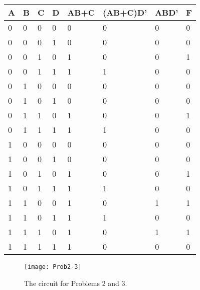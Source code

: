 \begin{enumerate}
\begin{enumerate}
\begin{onlysolution}
                    \begin{tabular}{l|l|l|l|l|l|l|l}
                        A &  B &  C &  D & AB+C  & (AB+C)D' & ABD'  &  F    \\ \hline \rowcolor{gray!15}
                        0 &  0 &  0 &  0 &  0 &  0 &  0 &  0                \\ \hline
                        0 &  0 &  0 &  1 &  0 &  0 &  0 &  0                \\ \hline \rowcolor{gray!15}
                        0 &  0 &  1 &  0 &  1 &  0 &  0 &  1                \\ \hline
                        0 &  0 &  1 &  1 &  1 &  1 &  0 &  0                \\ \hline \rowcolor{gray!15}
                        0 &  1 &  0 &  0 &  0 &  0 &  0 &  0                \\ \hline
                        0 &  1 &  0 &  1 &  0 &  0 &  0 &  0                \\ \hline \rowcolor{gray!15}
                        0 &  1 &  1 &  0 &  1 &  0 &  0 &  1                \\ \hline
                        0 &  1 &  1 &  1 &  1 &  1 &  0 &  0                \\ \hline \rowcolor{gray!15}
                        1 &  0 &  0 &  0 &  0 &  0 &  0 &  0                \\ \hline
                        1 &  0 &  0 &  1 &  0 &  0 &  0 &  0                \\ \hline \rowcolor{gray!15}
                        1 &  0 &  1 &  0 &  1 &  0 &  0 &  1                \\ \hline
                        1 &  0 &  1 &  1 &  1 &  1 &  0 &  0                \\ \hline \rowcolor{gray!15}
                        1 &  1 &  0 &  0 &  1 &  0 &  1 &  1                \\ \hline
                        1 &  1 &  0 &  1 &  1 &  1 &  0 &  0                \\ \hline \rowcolor{gray!15}
                        1 &  1 &  1 &  0 &  1 &  0 &  1 &  1                \\ \hline
                        1 &  1 &  1 &  1 &  1 &  0 &  0 &  0                \\
                    \end{tabular}
                \end{onlysolution}
        \end{enumerate}
        \begin{figure}[ht]
            \texttt{[image: Prob2-3]}
            \caption{The circuit for Problems 2 and 3.}
            \label{fig:representationsHwCir2Bool}
        \end{figure}


\end{enumerate}
